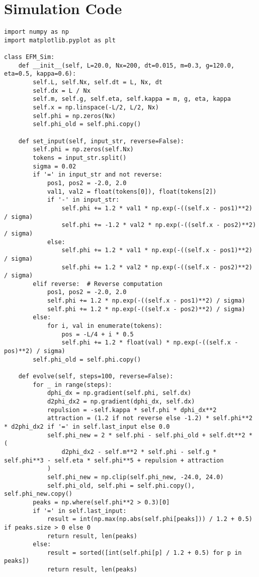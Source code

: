 \documentclass[11pt]{article}
\begin{document}
\section{Simulation Code}
\lstset{language=Python, basicstyle=\footnotesize\ttfamily, breaklines=true, numbers=left}
\begin{lstlisting}
import numpy as np
import matplotlib.pyplot as plt

class EFM_Sim:
    def __init__(self, L=20.0, Nx=200, dt=0.015, m=0.3, g=120.0, eta=0.5, kappa=0.6):
        self.L, self.Nx, self.dt = L, Nx, dt
        self.dx = L / Nx
        self.m, self.g, self.eta, self.kappa = m, g, eta, kappa
        self.x = np.linspace(-L/2, L/2, Nx)
        self.phi = np.zeros(Nx)
        self.phi_old = self.phi.copy()

    def set_input(self, input_str, reverse=False):
        self.phi = np.zeros(self.Nx)
        tokens = input_str.split()
        sigma = 0.02
        if '=' in input_str and not reverse:
            pos1, pos2 = -2.0, 2.0
            val1, val2 = float(tokens[0]), float(tokens[2])
            if '-' in input_str:
                self.phi += 1.2 * val1 * np.exp(-((self.x - pos1)**2) / sigma)
                self.phi += -1.2 * val2 * np.exp(-((self.x - pos2)**2) / sigma)
            else:
                self.phi += 1.2 * val1 * np.exp(-((self.x - pos1)**2) / sigma)
                self.phi += 1.2 * val2 * np.exp(-((self.x - pos2)**2) / sigma)
        elif reverse:  # Reverse computation
            pos1, pos2 = -2.0, 2.0
            self.phi += 1.2 * np.exp(-((self.x - pos1)**2) / sigma)
            self.phi += 1.2 * np.exp(-((self.x - pos2)**2) / sigma)
        else:
            for i, val in enumerate(tokens):
                pos = -L/4 + i * 0.5
                self.phi += 1.2 * float(val) * np.exp(-((self.x - pos)**2) / sigma)
        self.phi_old = self.phi.copy()

    def evolve(self, steps=100, reverse=False):
        for _ in range(steps):
            dphi_dx = np.gradient(self.phi, self.dx)
            d2phi_dx2 = np.gradient(dphi_dx, self.dx)
            repulsion = -self.kappa * self.phi * dphi_dx**2
            attraction = (1.2 if not reverse else -1.2) * self.phi**2 * d2phi_dx2 if '=' in self.last_input else 0.0
            self.phi_new = 2 * self.phi - self.phi_old + self.dt**2 * (
                d2phi_dx2 - self.m**2 * self.phi - self.g * self.phi**3 - self.eta * self.phi**5 + repulsion + attraction
            )
            self.phi_new = np.clip(self.phi_new, -24.0, 24.0)
            self.phi_old, self.phi = self.phi.copy(), self.phi_new.copy()
        peaks = np.where(self.phi**2 > 0.3)[0]
        if '=' in self.last_input:
            result = int(np.max(np.abs(self.phi[peaks])) / 1.2 + 0.5) if peaks.size > 0 else 0
            return result, len(peaks)
        else:
            result = sorted([int(self.phi[p] / 1.2 + 0.5) for p in peaks])
            return result, len(peaks)


\end{lstlisting}
\end{document}
